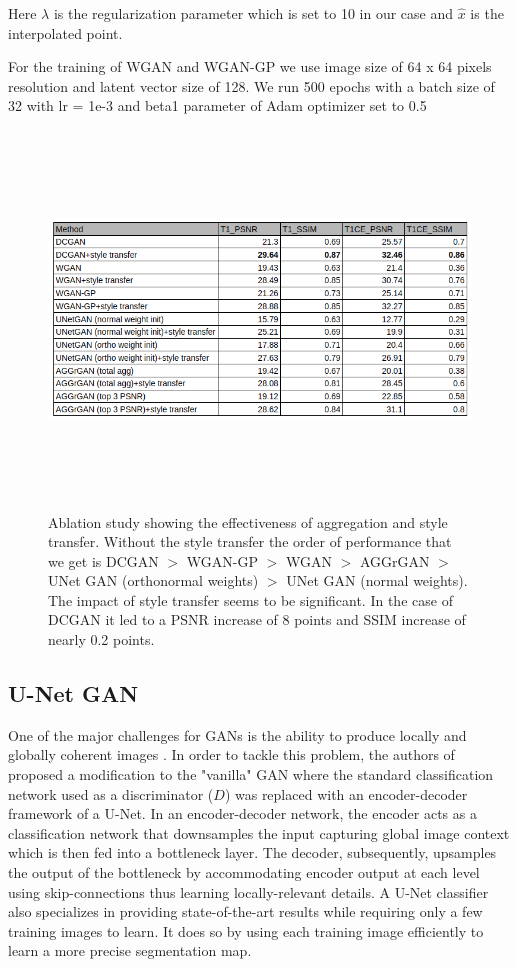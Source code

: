 \documentclass[10pt,journal,compsoc]{IEEEtran}
\begin{document}
Here $\lambda$ is the regularization parameter which is set to 10 in our case and $\hat{x}$ is the interpolated point.

For the training of WGAN and WGAN-GP we use image size of 64 x 64 pixels resolution and latent vector size of 128. We run 500 epochs with a batch size of 32 with lr = 1e-3 
and beta1 parameter of Adam optimizer set to 0.5

\begin{figure}[h]
\centering
\includegraphics[width=18cm, height=10cm]{score_table.png}
\caption{
  Ablation study showing the effectiveness of aggregation and style transfer. Without the style transfer the order of performance that we get is DCGAN $>$
  WGAN-GP $>$ WGAN $>$ AGGrGAN $>$ UNet GAN (orthonormal weights) $>$ UNet GAN (normal weights). The impact of style transfer seems to be significant.
  In the case of DCGAN it led to a PSNR increase of 8 points and SSIM increase of nearly 0.2 points.
}
\label{figure:3}
\end{figure}

\subsection{U-Net GAN}
One of the major challenges for GANs is the ability to produce locally and globally coherent images \cite{Schonfeld2020}. In order to tackle this problem, the authors of \cite{Schonfeld2020} proposed a modification to the "vanilla" GAN where the standard classification network used as a discriminator ($D$) was replaced with an encoder-decoder framework of a U-Net. In an encoder-decoder network, the encoder acts as a classification network that downsamples the input capturing global image context which is then fed into a bottleneck layer. The decoder, subsequently, upsamples the output of the bottleneck by accommodating encoder output at each level using skip-connections thus learning locally-relevant details. A U-Net classifier also specializes in providing state-of-the-art results while requiring only a few training images to learn. It does so by using each training image efficiently to learn a more precise segmentation map.
\end{document}
